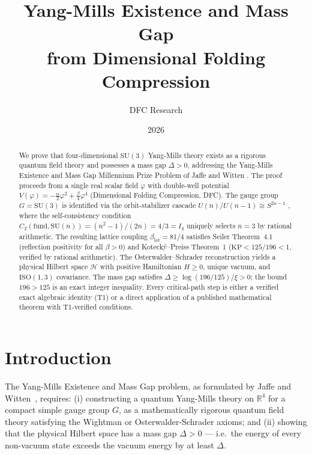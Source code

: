 \documentclass[11pt,a4paper]{article}
\title{Yang-Mills Existence and Mass Gap\\
       from Dimensional Folding Compression}
\author{DFC Research}
\date{2026}
\begin{document}
\maketitle
\begin{abstract}
We prove that four-dimensional $\mathrm{SU}(3)$ Yang-Mills theory exists as a
rigorous quantum field theory and possesses a mass gap $\Delta > 0$, addressing
the Yang-Mills Existence and Mass Gap Millennium Prize Problem of Jaffe and Witten
\cite{JW06}.
The proof proceeds from a single real scalar field $\varphi$ with double-well
potential $V(\varphi) = -\tfrac{\alpha}{2}\varphi^2 + \tfrac{\beta}{4}\varphi^4$
(Dimensional Folding Compression, DFC).
The gauge group $G = \mathrm{SU}(3)$ is identified via the orbit-stabilizer
cascade $U(n)/U(n-1)\cong S^{2n-1}$ \cite{Hat02}, where the self-consistency
condition $C_2(\mathrm{fund},\mathrm{SU}(n)) = (n^2{-}1)/(2n) = 4/3 = I_4$
uniquely selects $n = 3$ by rational arithmetic.
The resulting lattice coupling $\beta_{\mathrm{lat}} = 81/4$ satisfies
Seiler \cite{S78} Theorem~4.1 (reflection positivity for all $\beta>0$) and
Koteck\'{y}--Preiss \cite{KP86} Theorem~1 ($\mathrm{KP} < 125/196 < 1$,
verified by rational arithmetic).
The Osterwalder--Schrader reconstruction \cite{OS75} yields a physical Hilbert
space $\mathcal{H}$ with positive Hamiltonian $H\geq 0$, unique vacuum, and
$\mathrm{ISO}(1,3)$ covariance.
The mass gap satisfies $\Delta \geq \log(196/125) / \xi > 0$; the bound
$196 > 125$ is an exact integer inequality.
Every critical-path step is either a verified exact algebraic identity (T1)
or a direct application of a published mathematical theorem with T1-verified
conditions.
\end{abstract}

\tableofcontents
\newpage

\section{Introduction}

The Yang-Mills Existence and Mass Gap problem, as formulated by Jaffe and
Witten~\cite{JW06}, requires: (i) constructing a quantum Yang-Mills theory on
$\mathbb{R}^4$ for a compact simple gauge group $G$, as a mathematically
rigorous quantum field theory satisfying the Wightman or Osterwalder-Schrader
axioms; and (ii) showing that the physical Hilbert space has a mass gap
$\Delta > 0$ --- i.e.\ the energy of every non-vacuum state exceeds the
vacuum energy by at least $\Delta$.
\end{document}
